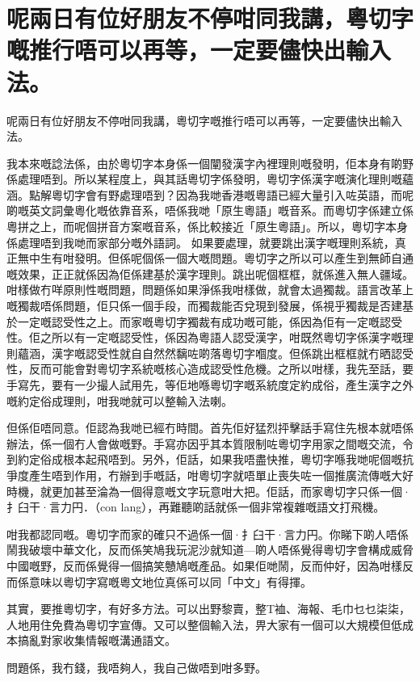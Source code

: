 \section{呢兩日有位好朋友不停咁同我講，粵切字嘅推行唔可以再等，一定要儘快出輸入法。}
呢兩日有位好朋友不停咁同我講，粵切字嘅推行唔可以再等，一定要儘快出輸入法。

我本來嘅諗法係，由於粵切字本身係一個闡發漢字內裡理則嘅發明，佢本身有啲野係處理唔到。所以某程度上，與其話粵切字係發明，粵切字係漢字嘅演化理則嘅蘊涵。點解粵切字會有野處理唔到？因為我哋香港嘅粵語已經大量引入咗英語，而呢啲嘅英文詞彙粵化嘅依靠音系，唔係我哋「原生粵語」嘅音系。而粵切字係建立係粵拼之上，而呢個拼音方案嘅音系，係比較接近「原生粵語」。所以，粵切字本身係處理唔到我哋而家部分嘅外語詞。
如果要處理，就要跳出漢字嘅理則系統，真正無中生有咁發明。但係呢個係一個大嘅問題。粵切字之所以可以產生到無師自通嘅效果，正正就係因為佢係建基於漢字理則。跳出呢個框框，就係進入無人疆域。咁樣做冇咩原則性嘅問題，問題係如果淨係我咁樣做，就會太過獨裁。語言改革上嘅獨裁唔係問題，佢只係一個手段，而獨裁能否兌現到發展，係視乎獨裁是否建基於一定嘅認受性之上。而家嘅粵切字獨裁有成功嘅可能，係因為佢有一定嘅認受性。佢之所以有一定嘅認受性，係因為粵語人認受漢字，咁既然粵切字係漢字嘅理則蘊涵，漢字嘅認受性就自自然然黐咗啲落粵切字嗰度。但係跳出框框就冇晒認受性，反而可能會對粵切字系統嘅核心造成認受性危機。之所以咁樣，我先至話，要手寫先，要有一少撮人試用先，等佢地喺粵切字嘅系統度定約成俗，產生漢字之外嘅約定俗成理則，咁我哋就可以整輸入法喇。

但係佢唔同意。佢認為我哋已經冇時間。首先佢好猛烈抨擊話手寫住先根本就唔係辦法，係一個冇人會做嘅野。手寫亦因乎其本質限制咗粵切字用家之間嘅交流，令到約定俗成根本起飛唔到。另外，佢話，如果我唔盡快推，粵切字喺我哋呢個嘅抗爭度產生唔到作用，冇辦到手嘅話，咁粵切字就唔單止喪失咗一個推廣流傳嘅大好時機，就更加甚至淪為一個得意嘅文字玩意咁大把。佢話，而家粵切字只係一個·扌臼干·言力円．（con lang），再難聽啲話就係一個非常複雜嘅語文打飛機。

咁我都認同嘅。粵切字而家的確只不過係一個·扌臼干·言力円\textsubscript{}。你睇下啲人唔係鬧我破壞中華文化，反而係笑鳩我玩泥沙就知道—啲人唔係覺得粵切字會構成威脅中國嘅野，反而係覺得一個搞笑戇鳩嘅產品。如果佢哋鬧，反而仲好，因為咁樣反而係意味以粵切字寫嘅粵文地位真係可以同「中文」有得揮。

其實，要推粵切字，有好多方法。可以出野黎賣，整T裇、海報、毛巾乜乜柒柒，人地用住免費為粵切字宣傳。又可以整個輸入法，畀大家有一個可以大規模但低成本搞亂對家收集情報嘅溝通語文。

問題係，我冇錢，我唔夠人，我自己做唔到咁多野。

